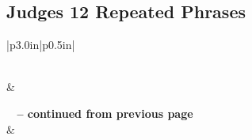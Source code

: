 \subsection{Judges 12 Repeated Phrases}


\normalsize
 
\begin{center}
\begin{longtable}{|p{3.0in}|p{0.5in}|}
\caption[Judges 12 Repeated Phrases]{Judges 12 Repeated Phrases}\label{table:Repeated Phrases Judges 12} \\
\hline {} &  \\ \hline 
\endfirsthead
 
{{\bfseries \tablename\ \thetable{} -- continued from previous page}} \\  
\hline {} &  \\ \hline 
\endhead
 

\end{longtable}
\end{center}
